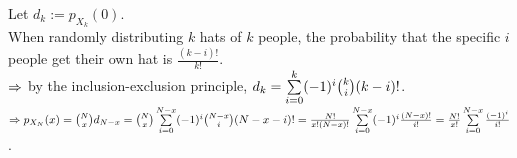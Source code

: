 \begin{pr}
Let $d_k:=p_{X_k}(0)$.\\
When randomly distributing $k$ hats of $k$ people, the probability that the specific $i$ people get their own hat is $\frac{(k-i)!}{k!}$.\\
$\Rightarrow$ by the inclusion-exclusion principle, $d_k=\sum\limits_{i=0}^k(-1)^i\binom ki(k-i)!$.\\
$\Rightarrow p_{X_N}(x)=\binom Nxd_{N-x}=\binom Nx\sum\limits_{i=0}^{N-x}(-1)^i\binom{N-x}i(N-x-i)!=\frac{N!}{x!(N-x)!}\sum\limits_{i=0}^{N-x}(-1)^i\frac{(N-x)!}{i!}=\frac{N!}{x!}\sum\limits_{i=0}^{N-x}\frac{(-1)^i}{i!}$.
\end{pr}
